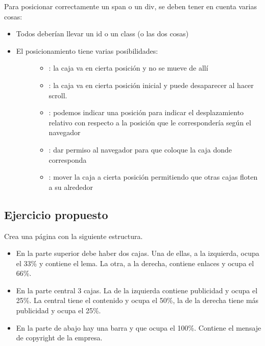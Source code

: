 \documentclass[letterpaper,10pt,spanish]{sphinxmanual}
\begin{document}
Para posicionar correctamente un span o un div, se deben tener en cuenta
varias cosas:
\begin{itemize}
\item {} 
Todos deberían llevar un id o un class (o las dos cosas)

\item {} \begin{description}
\item[{El posicionamiento tiene varias posibilidades:}] \leavevmode\begin{itemize}
\item {} 
: la caja va en cierta posición y no se mueve de allí

\item {} 
: la caja va en cierta posición inicial y puede desaparecer al hacer scroll.

\item {} 
: podemos indicar una posición para indicar el desplazamiento relativo con respecto a la posición que le correspondería según el navegador

\item {} 
: dar permiso al navegador para que coloque la caja donde corresponda

\item {} 
: mover la caja a cierta posición permitiendo que otras cajas floten a su alrededor

\end{itemize}

\end{description}

\end{itemize}


\subsection{Ejercicio propuesto}
\label{\detokenize{tema3:ejercicio-propuesto}}
Crea una página con la siguiente estructura.
\begin{itemize}
\item {} 
En la parte superior debe haber dos cajas. Una de ellas, a la izquierda, ocupa el 33\% y contiene el lema. La otra, a la derecha, contiene enlaces y ocupa el 66\%.

\item {} 
En la parte central 3 cajas. La de la izquierda contiene publicidad y ocupa el 25\%. La central tiene el contenido y ocupa el 50\%, la de la derecha tiene más publicidad y ocupa el 25\%.

\item {} 
En la parte de abajo hay una barra  y que ocupa el 100\%. Contiene el mensaje de copyright de la empresa.

\end{itemize}
\end{document}
